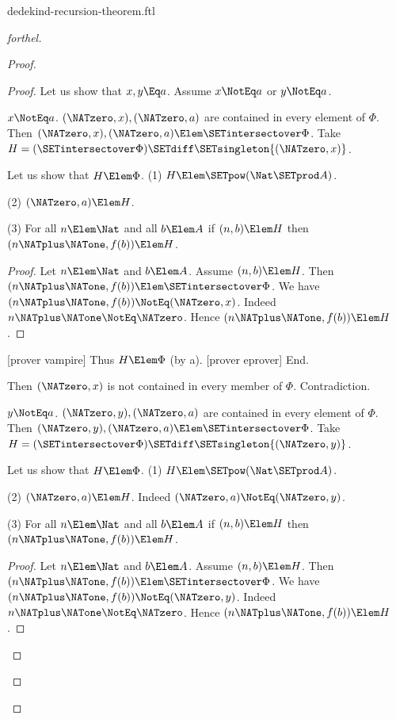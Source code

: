 \documentclass{stex}
\begin{document}
\begin{smodule}{dedekind-recursion-theorem.ftl}
\begin{proof}[forthel]
\begin{proof}
\begin{proof}
        Let us show that $x, y \Eq a$.
          Assume $x \NotEq a$ or $y \NotEq a$.

          \begin{case}{$x \NotEq a$.}
            $(\NATzero,x), (\NATzero,a)$ are contained in every element of $\Phi$.
            Then $(\NATzero,x), (\NATzero,a) \Elem \SETintersectover \Phi$.
            Take $H = (\SETintersectover \Phi) \SETdiff \SETsingleton{(\NATzero,x)}$.

            Let us show that $H \Elem \Phi$.
              (1) $H \Elem \SETpow(\Nat \SETprod A)$.

              (2) $(\NATzero,a) \Elem H$.

              (3) For all $n \Elem \Nat$ and all $b \Elem A$ if
              $(n,b) \Elem H$ then $(n \NATplus \NATone, f(b)) \Elem H$.
              \begin{proof}
                Let $n \Elem \Nat$ and $b \Elem A$.
                Assume $(n,b) \Elem H$.
                Then $(n \NATplus \NATone, f(b)) \Elem \SETintersectover \Phi$.
                We have $(n \NATplus \NATone, f(b)) \NotEq (\NATzero,x)$.
                Indeed $n \NATplus \NATone \NotEq \NATzero$.
                Hence $(n \NATplus \NATone, f(b)) \Elem H$.
              \end{proof}

              [prover vampire]
              Thus $H \Elem \Phi$ (by a).
              [prover eprover]
            End.

            Then $(\NATzero,x)$ is not contained in every member of $\Phi$.
            Contradiction.
          \end{case}

          \begin{case}{$y \NotEq a$.}
            $(\NATzero,y), (\NATzero,a)$ are contained in every element of $\Phi$.
            Then $(\NATzero,y), (\NATzero,a) \Elem \SETintersectover \Phi$.
            Take $H = (\SETintersectover \Phi) \SETdiff \SETsingleton{(\NATzero,y)}$.

            Let us show that $H \Elem \Phi$.
              (1) $H \Elem \SETpow(\Nat \SETprod A)$.

              (2) $(\NATzero,a) \Elem H$.
              Indeed $(\NATzero,a) \NotEq (\NATzero,y)$.

              (3) For all $n \Elem \Nat$ and all $b \Elem A$ if
              $(n,b) \Elem H$ then $(n \NATplus \NATone, f(b)) \Elem H$.
              \begin{proof}
                Let $n \Elem \Nat$ and $b \Elem A$.
                Assume $(n,b) \Elem H$.
                Then $(n \NATplus \NATone, f(b)) \Elem \SETintersectover \Phi$.
                We have $(n \NATplus \NATone, f(b)) \NotEq (\NATzero,y)$.
                Indeed $n \NATplus \NATone \NotEq \NATzero$.
                Hence $(n \NATplus \NATone, f(b)) \Elem H$.
              \end{proof}


\end{case}
\end{proof}
\end{proof}
\end{proof}
\end{smodule}
\end{document}
